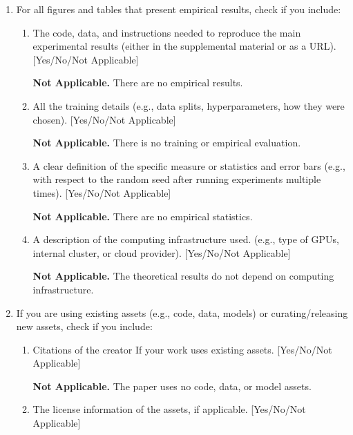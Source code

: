 \begin{enumerate}[leftmargin=*]
\begin{enumerate}
  \item Clear explanations of any assumptions. [Yes/No/Not Applicable]

  \textbf{Yes.} Sections~\ref{sec:model} and~\ref{sec:regret} explain feature-random order, adaptive labels, doubly-uniformity, and the rank dependence. The limitations are discussed in Section~6.
  \end{enumerate}

\item For all figures and tables that present empirical results, check if you include:
  \begin{enumerate}
  \item The code, data, and instructions needed to reproduce the main experimental results (either in the supplemental material or as a URL). [Yes/No/Not Applicable]

  \textbf{Not Applicable.} There are no empirical results.

  \item All the training details (e.g., data splits, hyperparameters, how they were chosen). [Yes/No/Not Applicable]

  \textbf{Not Applicable.} There is no training or empirical evaluation.

  \item A clear definition of the specific measure or statistics and error bars (e.g., with respect to the random seed after running experiments multiple times). [Yes/No/Not Applicable]

  \textbf{Not Applicable.} There are no empirical statistics.

  \item A description of the computing infrastructure used. (e.g., type of GPUs, internal cluster, or cloud provider). [Yes/No/Not Applicable]

  \textbf{Not Applicable.} The theoretical results do not depend on computing infrastructure.
  \end{enumerate}

\item If you are using existing assets (e.g., code, data, models) or curating/releasing new assets, check if you include:
  \begin{enumerate}
  \item Citations of the creator If your work uses existing assets. [Yes/No/Not Applicable]

  \textbf{Not Applicable.} The paper uses no code, data, or model assets.

  \item The license information of the assets, if applicable. [Yes/No/Not Applicable]


\end{enumerate}
\end{enumerate}
